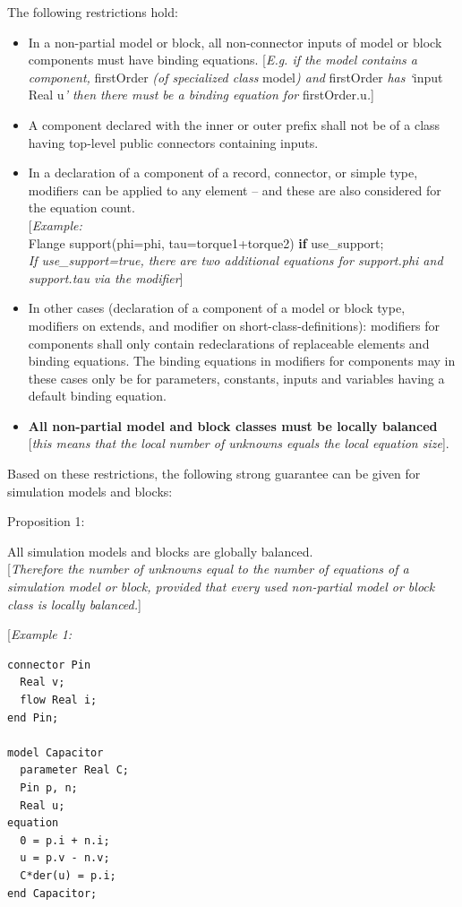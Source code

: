 \documentclass[10pt,a4paper]{report}
\begin{document}
The following restrictions hold:

\begin{itemize}
\item
  In a non-partial model or block, all non-connector inputs of model or
  block components must have binding equations. {[}\emph{E.g. if the
  model contains a component,} firstOrder \emph{(of specialized class}
  model\emph{) and} firstOrder \emph{has `}input Real u\emph{' then
  there must be a binding equation for} firstOrder.u\emph{.}{]}
\item
  A component declared with the inner or outer prefix shall not be of a
  class having top-level public connectors containing inputs.
\item
  In a declaration of a component of a record, connector, or simple
  type, modifiers can be applied to any element -- and these are also
  considered for the equation count.\\
  {[}\emph{Example:}\\
  Flange support(phi=phi, tau=torque1+torque2) \textbf{if}
  use\_support;\\
  \emph{If use\_support=true, there are two additional equations for
  support.phi and support.tau via the modifier}{]}
\item
  In other cases (declaration of a component of a model or block type,
  modifiers on extends, and modifier on short-class-definitions):
  modifiers for components shall only contain redeclarations of
  replaceable elements and binding equations. The binding equations in
  modifiers for components may in these cases only be for parameters,
  constants, inputs and variables having a default binding equation.
\item
  \textbf{All non-partial model and block classes must be locally
  balanced} {[}\emph{this means that the local number of unknowns equals
  the local equation size}{]}.
\end{itemize}

Based on these restrictions, the following strong guarantee can be given
for simulation models and blocks:

Proposition 1:

All simulation models and blocks are globally balanced.\\
{[}\emph{Therefore the number of unknowns equal to the number of
equations of a simulation model or block, provided that every used
non-partial model or block class is locally balanced.}{]}

{[}\emph{Example 1:}
\begin{lstlisting}[language=modelica]
connector Pin
  Real v;
  flow Real i;
end Pin;

model Capacitor
  parameter Real C;
  Pin p, n;
  Real u;
equation
  0 = p.i + n.i; 
  u = p.v - n.v;
  C*der(u) = p.i; 
end Capacitor;
\end{lstlisting}
\end{document}
